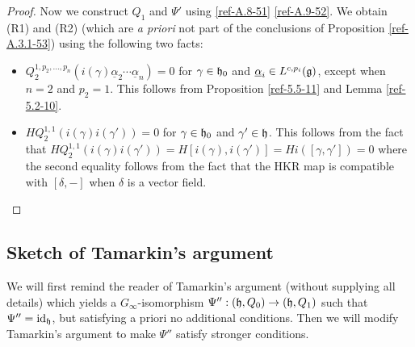 \documentclass{amsart}
\numberwithin{equation}{section}
\theoremstyle{definition}
\theoremstyle{remark}
\begin{document}
\begin{proof}
Now we construct $Q_1$ and $\Psi'$ using \eqref{ref-A.8-51}
\eqref{ref-A.9-52}.  We obtain
(R1) and (R2) (which are {\it a priori} not part of the conclusions of Proposition
\ref{ref-A.3.1-53}) using the following two facts:
\begin{itemize}
\item $Q_2^{1,p_2,\ldots,p_n}(i(\gamma)\underline{\alpha}_2\cdots\underline{\alpha}_n)=0$
  for $\gamma\in \frak{h}_0$ and $\underline{\alpha}_i\in
  L^{c,p_i}(\frak{g})$, except when $n=2$ and $p_2=1$. 
This follows from Proposition \ref{ref-5.5-11} and Lemma \ref{ref-5.2-10}. 
\item $HQ_2^{1,1}(i(\gamma) i(\gamma'))=0$ for $\gamma\in \frak{h}_0$
  and $\gamma'\in \frak{h}$. This follows from the fact that
  $HQ_2^{1,1}(i(\gamma)
  i(\gamma'))=H[i(\gamma),i(\gamma')]=Hi([\gamma,\gamma'])=0$ where
the second equality follows from the fact that the HKR map is 
compatible with $[\delta,-]$ when $\delta$ is a vector field. {}
\end{itemize}
\end{proof}

\subsection{Sketch of Tamarkin's argument}
\label{ref-A.4-54}
We will first remind the reader of Tamarkin's argument (without
supplying all details) which yields a $G_\infty$-isomorphism
$\Psi'':(\frak{h},Q_0)\rightarrow (\frak{h},Q_1)$ such that $\Psi^{\prime
  \prime}={\operatorname{id}}_{\frak{h}}$, but satisfying a priori no additional
conditions. Then we will modify Tamarkin's argument to make $\Psi''$
satisfy stronger conditions.

\medskip
\end{document}
